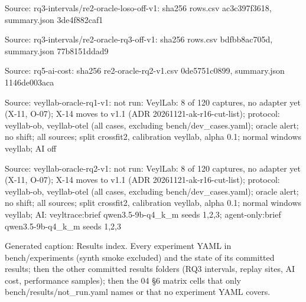 \noindent Source: rq3-intervals/\allowbreak{}re2-oracle-loso-off-v1: sha256 rows.csv ac3c397f3618, summary.json 3de4f882caf1\par
\noindent Source: rq3-intervals/\allowbreak{}re2-oracle-rq3-off-v1: sha256 rows.csv bdfbb8ac705d, summary.json 77b8151ddad9\par
\noindent Source: rq5-ai-cost: sha256 re2-oracle-rq2-v1.csv 0de5751c0899, summary.json 1146de003aca\par
\noindent Source: veyllab-oracle-rq1-v1: not run: VeylLab: 8 of 120 captures, no adapter yet (X-11, O-07); X-14 moves to v1.1 (ADR 20261121-ak-r16-cut-list); protocol: veyllab-ob, veyllab-otel (all cases, excluding bench/\allowbreak{}dev\_cases.yaml); oracle alert; no shift; all sources; split crossfit2, calibration veyllab, alpha 0.1; normal windows veyllab; AI off\par
\noindent Source: veyllab-oracle-rq2-v1: not run: VeylLab: 8 of 120 captures, no adapter yet (X-11, O-07); X-14 moves to v1.1 (ADR 20261121-ak-r16-cut-list); protocol: veyllab-ob, veyllab-otel (all cases, excluding bench/\allowbreak{}dev\_cases.yaml); oracle alert; no shift; all sources; split crossfit2, calibration veyllab, alpha 0.1; normal windows veyllab; AI: veyltrace:brief qwen3.5-9b-q4\_k\_m seeds 1,2,3; agent-only:brief qwen3.5-9b-q4\_k\_m seeds 1,2,3\par
\noindent Generated caption: Results index. Every experiment YAML in bench/\allowbreak{}experiments (synth smoke excluded) and the state of its committed results; then the other committed results folders (RQ3 intervals, replay sites, AI cost, performance samples); then the 04 \S{}6 matrix cells that only bench/\allowbreak{}results/\allowbreak{}not\_run.yaml names or that no experiment YAML covers.\par
\endgroup
